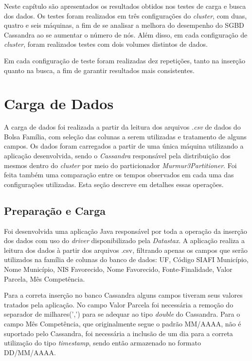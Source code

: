 Neste capítulo são apresentados os resultados obtidos nos testes de carga e busca dos dados. Os testes foram realizados em três configurações do \emph{cluster}, com duas, quatro e seis máquinas, a fim de se analisar a melhora do desempenho do SGBD Cassandra ao se aumentar o número de nós. Além disso, em cada configuração de \emph{cluster}, foram realizados testes com dois volumes distintos de dados.

Em cada configuração de teste foram realizadas dez repetições, tanto na inserção quanto na busca, a fim de garantir resultados mais consistentes. 

\section{Carga de Dados}
A carga de dados foi realizada a partir da leitura dos arquivos \emph{.csv} de dados do Bolsa Família, com seleção das colunas a serem utilizadas e tratamento de alguns campos.
Os dados foram carregados a partir de uma única máquina utilizando a aplicação desenvolvida, sendo o \emph{Cassandra} responsável pela distribuição dos mesmos dentro do \emph{cluster} por meio do particionador \emph{Murmur3Partitioner}. Foi feita também uma comparação entre os tempos observados em cada uma das configurações utilizadas. Esta seção descreve em detalhes essas operações.

\subsection{Preparação e Carga}
Foi desenvolvida uma aplicação Java responsável por toda a operação da inserção dos dados com uso do \emph{driver} disponibilizado pela \emph{Datastax}. A aplicação realiza a leitura dos dados à partir dos arquivos .csv, filtrando apenas os campos que serão utilizados na família de colunas do banco de dados: UF, Código SIAFI Município, Nome Município, NIS Favorecido, Nome Favorecido, Fonte-Finalidade, Valor Parcela, Mês Competência. 

Para a correta inserção no banco Cassandra alguns campos tiveram seus valores tratados pela aplicação. No campo Valor Parcela foi necessária a remoção do separador de milhares(',') para se adequar ao tipo \emph{double} do Cassandra. Para o campo Mês Competência, que originalmente segue o padrão MM/AAAA, não é suportado pelo Cassandra, foi necessária a inclusão de um dia para a correta utilização do tipo \emph{timestamp}, sendo então armazenado no formato DD/MM/AAAA.

